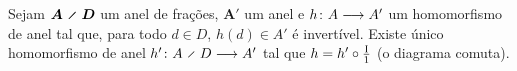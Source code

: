 \begin{proposition}
Sejam $\bm{A \olddiv D}$ um anel de frações, $\bm A'$ um anel e ${h}\colon {A} \longrightarrow {A'}$ um homomorfismo de anel tal que, para todo $d \in D$, $h(d) \in A'$ é invertível. Existe único homomorfismo de anel $\fun{h'}{A \olddiv D}{A'}$ tal que $h = h' \circ \frac{\mathrm{I}}{1}$ (o diagrama comuta).
\begin{figure}
\centering
{}
\end{figure}
\end{proposition}
